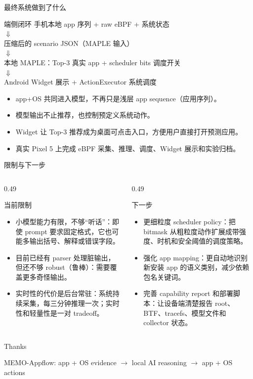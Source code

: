 \documentclass[UTF8,aspectratio=169,10pt]{ctexbeamer}
\begin{document}
\begin{frame}{最终系统做到了什么}
  \begin{block}{端侧闭环}
    \centering
    手机本地 app 序列 + raw eBPF + 系统状态\\
    \(\Downarrow\)\\
    压缩后的 scenario JSON（MAPLE 输入）\\
    \(\Downarrow\)\\
    本地 MAPLE：Top-3 真实 app + scheduler bits 调度开关\\
    \(\Downarrow\)\\
    Android Widget 展示 + ActionExecutor 系统调度
  \end{block}
  \begin{itemize}
    \item app+OS 共同进入模型，不再只是浅层 app sequence（应用序列）。
    \item 模型输出不止推荐，也控制预定义系统动作。
    \item Widget 让 Top-3 推荐成为桌面可点击入口，方便用户直接打开预测应用。
    \item 真实 Pixel 5 上完成 eBPF 采集、推理、调度、Widget 展示和实验归档。
  \end{itemize}
\end{frame}

\begin{frame}{限制与下一步}
  \begin{columns}[T,totalwidth=\textwidth]
    \begin{column}{0.49\textwidth}
      \begin{block}{当前限制}
        \begin{itemize}
          \item 小模型能力有限，不够“听话”：即使 prompt 要求固定格式，它也可能多输出括号、解释或错误字段。
          \item 目前已经有 parser 处理脏输出，但还不够 robust（鲁棒）：需要覆盖更多奇怪输出。
          \item 实时性的代价是后台常驻：系统持续采集，每三分钟推理一次；实时性和轻量性是一对 tradeoff。
        \end{itemize}
      \end{block}
    \end{column}
    \begin{column}{0.49\textwidth}
      \begin{block}{下一步}
        \begin{itemize}
          \item 更细粒度 scheduler policy：把 bitmask 从粗粒度动作扩展成带强度、时机和安全阈值的调度策略。
          \item 强化 app mapping：更自动地识别新安装 app 的语义类别，减少依赖包名关键词。
          \item 完善 capability report 和部署脚本：让设备端清楚报告 root、BTF、tracefs、模型文件和 collector 状态。
        \end{itemize}
      \end{block}
    \end{column}
  \end{columns}
\end{frame}

\begin{frame}
  \centering
  \Huge Thanks
  \vspace{1em}

  \large MEMO-Appflow: app + OS evidence \(\rightarrow\) local AI reasoning \(\rightarrow\) app + OS actions
\end{frame}
\end{document}
